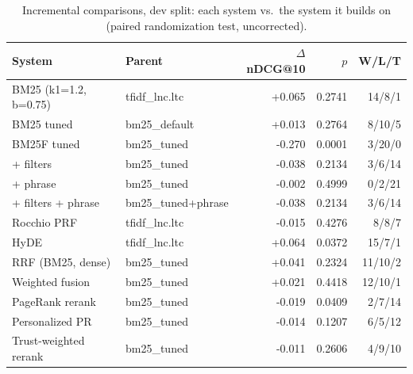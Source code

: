 \begin{table}[t]
\centering
\small
\begin{tabular}{llrrr}
\toprule
System & Parent & $\Delta$nDCG@10 & $p$ & W/L/T \\
\midrule
BM25 (k1=1.2, b=0.75) & tfidf\_lnc.ltc & +0.065 & 0.2741 & 14/8/1 \\
BM25 tuned & bm25\_default & +0.013 & 0.2764 & 8/10/5 \\
BM25F tuned & bm25\_tuned & -0.270 & 0.0001 & 3/20/0 \\
+ filters & bm25\_tuned & -0.038 & 0.2134 & 3/6/14 \\
+ phrase & bm25\_tuned & -0.002 & 0.4999 & 0/2/21 \\
+ filters + phrase & bm25\_tuned+phrase & -0.038 & 0.2134 & 3/6/14 \\
Rocchio PRF & tfidf\_lnc.ltc & -0.015 & 0.4276 & 8/8/7 \\
HyDE & tfidf\_lnc.ltc & +0.064 & 0.0372 & 15/7/1 \\
RRF (BM25, dense) & bm25\_tuned & +0.041 & 0.2324 & 11/10/2 \\
Weighted fusion & bm25\_tuned & +0.021 & 0.4418 & 12/10/1 \\
PageRank rerank & bm25\_tuned & -0.019 & 0.0409 & 2/7/14 \\
Personalized PR & bm25\_tuned & -0.014 & 0.1207 & 6/5/12 \\
Trust-weighted rerank & bm25\_tuned & -0.011 & 0.2606 & 4/9/10 \\
\bottomrule
\end{tabular}
\caption{Incremental comparisons, dev split: each system vs.\ the system it builds on (paired randomization test, uncorrected).}
\label{tab:ablation-incremental-dev}
\end{table}

